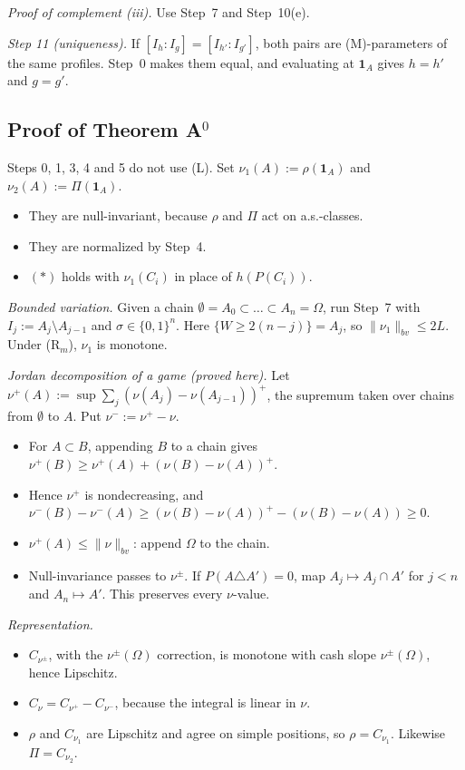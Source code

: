 \emph{Proof of complement (iii).} Use Step~7 and Step~10(e).

\textit{Step 11 (uniqueness).} If $[I_h:I_g]=[I_{h'}:I_{g'}]$, both pairs are (M)-parameters of the same profiles. Step~0 makes them equal, and evaluating at $\mathbf 1_A$ gives $h=h'$ and $g=g'$.

\subsection{Proof of Theorem A$^0$}

Steps 0, 1, 3, 4 and 5 do not use (L). Set $\nu_1(A):=\rho(\mathbf 1_A)$ and $\nu_2(A):=\Pi(\mathbf 1_A)$.
\begin{itemize}
\item They are null-invariant, because $\rho$ and $\Pi$ act on a.s.-classes.
\item They are normalized by Step~4.
\item $(*)$ holds with $\nu_1(C_i)$ in place of $h(P(C_i))$.
\end{itemize}

\emph{Bounded variation.} Given a chain $\emptyset=A_0\subset\dots\subset A_n=\Omega$, run Step~7 with $I_j:=A_j\setminus A_{j-1}$ and $\sigma\in\{0,1\}^n$. Here $\{W\ge2(n-j)\}=A_j$, so $\|\nu_1\|_{bv}\le2L$. Under (R$_m$), $\nu_1$ is monotone.

\emph{Jordan decomposition of a game (proved here).} Let $\nu^+(A):=\sup\sum_j(\nu(A_j)-\nu(A_{j-1}))^+$, the supremum taken over chains from $\emptyset$ to $A$. Put $\nu^-:=\nu^+-\nu$.
\begin{itemize}
\item For $A\subset B$, appending $B$ to a chain gives $\nu^+(B)\ge\nu^+(A)+(\nu(B)-\nu(A))^+$.
\item Hence $\nu^+$ is nondecreasing, and $\nu^-(B)-\nu^-(A)\ge(\nu(B)-\nu(A))^+-(\nu(B)-\nu(A))\ge0$.
\item $\nu^+(A)\le\|\nu\|_{bv}$: append $\Omega$ to the chain.
\item Null-invariance passes to $\nu^\pm$. If $P(A\triangle A')=0$, map $A_j\mapsto A_j\cap A'$ for $j<n$ and $A_n\mapsto A'$. This preserves every $\nu$-value.
\end{itemize}

\emph{Representation.}
\begin{itemize}
\item $C_{\nu^\pm}$, with the $\nu^\pm(\Omega)$ correction, is monotone with cash slope $\nu^\pm(\Omega)$, hence Lipschitz.
\item $C_\nu=C_{\nu^+}-C_{\nu^-}$, because the integral is linear in $\nu$.
\item $\rho$ and $C_{\nu_1}$ are Lipschitz and agree on simple positions, so $\rho=C_{\nu_1}$. Likewise $\Pi=C_{\nu_2}$.
\end{itemize}

